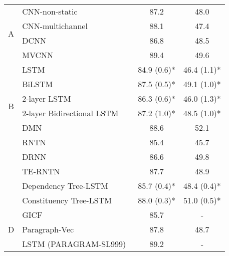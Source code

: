 \begin{table*}[]
\begin{tabular}{|c|l|ll|ll|}
		\multirow{4}{*}{A} & CNN-non-static~\cite{KimCNN} & \multicolumn{2}{c|}{87.2} & \multicolumn{2}{c|}{48.0} \Tstrut \\
		& CNN-multichannel~\cite{KimCNN} & \multicolumn{2}{c|}{88.1} & \multicolumn{2}{c|}{47.4} \\
		& DCNN~\cite{DCNN} & \multicolumn{2}{c|}{86.8} & \multicolumn{2}{c|}{48.5} \\
		& MVCNN~\cite{2-layer-cnn} & \multicolumn{2}{c|}{89.4} & \multicolumn{2}{c|}{49.6} \\
		\hline
		\multirow{6}{*}{B} & LSTM~\cite{treeLSTM}   & \multicolumn{2}{c|}{84.9 (0.6)*} & \multicolumn{2}{c|}{46.4 (1.1)*} \\
		& BiLSTM~\cite{treeLSTM}  & \multicolumn{2}{c|}{87.5 (0.5)*} & \multicolumn{2}{c|}{49.1 (1.0)*}   \\
		& 2-layer LSTM~\cite{treeLSTM} & \multicolumn{2}{c|}{86.3 (0.6)*} & \multicolumn{2}{c|}{46.0 (1.3)*} \\
		& 2-layer Bidirectional LSTM~\cite{treeLSTM} & \multicolumn{2}{c|}{87.2 (1.0)*} & \multicolumn{2}{c|}{48.5 (1.0)*} \\
		& DMN~\cite{attention-gru} & \multicolumn{2}{c|}{88.6 } & \multicolumn{2}{c|}{52.1} \\
		\hline
		\multirow{6}{*}{C} & RNTN~\cite{socher2013recursive}  & \multicolumn{2}{c|}{85.4} & \multicolumn{2}{c|}{45.7} \\
		& DRNN~\cite{IrsoyDRNN} & \multicolumn{2}{c|}{86.6} & \multicolumn{2}{c|}{49.8}  \\
		& TE-RNTN~\cite{tag-embedding-rnn} & \multicolumn{2}{c|}{87.7} & \multicolumn{2}{c|}{48.9} \\
		& Dependency Tree-LSTM~\cite{treeLSTM}  & \multicolumn{2}{c|}{85.7 (0.4)*} & \multicolumn{2}{c|}{48.4 (0.4)*}  \\
		& Constituency Tree-LSTM~\cite{treeLSTM} &  \multicolumn{2}{c|}{88.0 (0.3)*}  & \multicolumn{2}{c|}{51.0 (0.5)*} \\
		\hline
		\multirow{3}{*}{D} & GICF~\cite{group-instance} & \multicolumn{2}{c|}{85.7}  &  \multicolumn{2}{c|}{-} \\
		& Paragraph-Vec~\cite{ParagraphVec} & \multicolumn{2}{c|}{87.8} & \multicolumn{2}{c|}{48.7} \\
		& LSTM (PARAGRAM-SL999)~\cite{wieting2015towards} & \multicolumn{2}{c|}{89.2} & \multicolumn{2}{c|}{-}
		\\

\end{tabular}
\end{table*}
